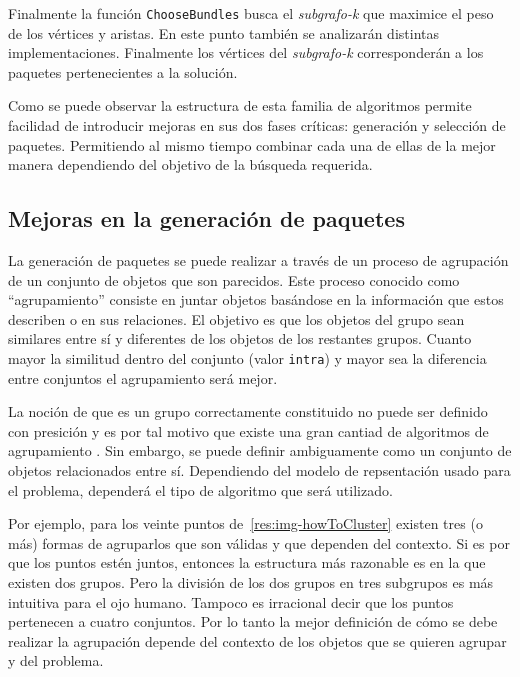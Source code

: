 Finalmente la función \texttt{ChooseBundles} busca el \textit{subgrafo-k} que maximice el peso de los vértices y aristas. En este punto también se analizarán distintas implementaciones. Finalmente los vértices del \textit{subgrafo-k} corresponderán a los paquetes pertenecientes a la solución.

Como se puede observar la estructura de esta familia de algoritmos permite facilidad de introducir mejoras en sus dos fases críticas: generación y selección de paquetes. Permitiendo al mismo tiempo combinar cada una de ellas de la mejor manera dependiendo del objetivo de la búsqueda requerida.

\subsection{Mejoras en la generación de paquetes}
La generación de paquetes se puede realizar a través de un proceso de agrupación de un conjunto de objetos que son parecidos. Este proceso conocido como ``agrupamiento'' consiste en juntar objetos basándose en la información que estos describen o en sus relaciones. El objetivo es que los objetos del grupo sean similares entre sí y diferentes de los objetos de los restantes grupos. Cuanto mayor la similitud dentro del conjunto (valor \texttt{intra}) y mayor sea la diferencia entre conjuntos el agrupamiento será mejor.

La noción de que es un grupo correctamente constituido no puede ser definido con presición y es por tal motivo que existe una gran cantiad de algoritmos de agrupamiento \cite{Estivill-Castro:2002:WSM:568574.568575}. Sin embargo, se puede definir ambiguamente como un conjunto de objetos relacionados entre sí. Dependiendo del modelo de repsentación usado para el problema, dependerá el tipo de algoritmo que será utilizado.

Por ejemplo, para los veinte puntos de~\autoref{res:img-howToCluster} existen tres (o más) formas de agruparlos que son válidas y que dependen del contexto. Si es por que los puntos estén juntos, entonces la estructura más razonable es en la que existen dos grupos. Pero la división de los dos grupos en tres subgrupos es más intuitiva para el ojo humano. Tampoco es irracional decir que los puntos pertenecen a cuatro conjuntos. Por lo tanto la mejor definición de cómo se debe realizar la agrupación depende del contexto de los objetos que se quieren agrupar y del problema.

